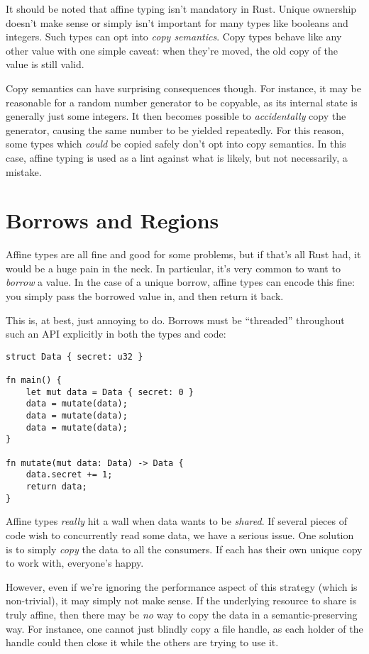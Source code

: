 It should be noted that affine typing isn't mandatory in Rust. Unique ownership
doesn't make sense or simply isn't important for many types like booleans and
integers. Such types can opt into \emph{copy semantics}. Copy types behave like any
other value with one simple caveat: when they're moved, the old copy of the
value is still valid.

Copy semantics can have surprising consequences though. For instance, it may be
reasonable for a random number generator to be copyable, as its internal
state is generally just some integers. It then becomes possible to
\emph{accidentally} copy the generator, causing the same number to be yielded
repeatedly. For this reason, some types which \emph{could} be copied safely don't opt
into copy semantics. In this case, affine typing is used as a lint against what
is likely, but not necessarily, a mistake.





\section{Borrows and Regions}

Affine types are all fine and good for some problems, but if that's all Rust had,
it would be a huge pain in the neck. In particular, it's very common to want
to \emph{borrow} a value. In the case of a unique borrow, affine types can encode
this fine: you simply pass the borrowed value in, and then return it back.

This is, at best, just annoying to do. Borrows must be ``threaded'' throughout
such an API explicitly in both the types and code:

\begin{verbatim}
struct Data { secret: u32 }

fn main() {
    let mut data = Data { secret: 0 }
    data = mutate(data);
    data = mutate(data);
    data = mutate(data);
}

fn mutate(mut data: Data) -> Data {
    data.secret += 1;
    return data;
}
\end{verbatim}

Affine types \emph{really} hit a wall when data wants to be \emph{shared}. If
several pieces of code wish to concurrently read some data, we have a serious
issue. One solution is to simply \emph{copy} the data to all the consumers. If each
has their own unique copy to work with, everyone's happy.

However, even if we're ignoring the performance aspect of this strategy (which
is non-trivial), it may simply not make sense. If the underlying resource to
share is truly affine, then there may be \emph{no} way to copy the data in a
semantic-preserving way. For instance, one cannot just blindly copy a file
handle, as each holder of the handle could then close it while the others are
trying to use it.

